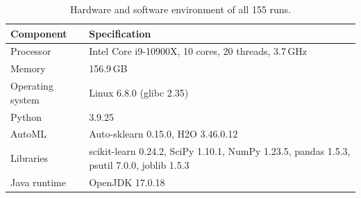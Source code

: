 \begin{table}[t]
\centering
\caption{Hardware and software environment of all 155 runs.}
\label{tab:env}
\scriptsize
\setlength{\tabcolsep}{3pt}
\begin{tabular}{@{}p{0.9in}p{2.3in}@{}}
\toprule
Component & Specification \\
\midrule
Processor & Intel Core i9-10900X, 10 cores, 20 threads, 3.7\,GHz \\
Memory & 156.9\,GB \\
Operating system & Linux 6.8.0 (glibc 2.35) \\
Python & 3.9.25 \\
AutoML & Auto-sklearn 0.15.0, H2O 3.46.0.12 \\
Libraries & scikit-learn 0.24.2, SciPy 1.10.1, NumPy 1.23.5, pandas 1.5.3, psutil 7.0.0, joblib 1.5.3 \\
Java runtime & OpenJDK 17.0.18 \\
\bottomrule
\end{tabular}
\end{table}
